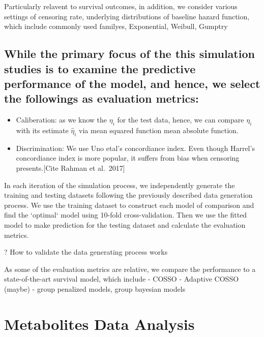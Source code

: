 \documentclass{article}
\begin{document}
Particularly relavent to survival outcomes, in addition, we consider
various settings of censoring rate, underlying distributions of baseline
hazard function, which include commonly used familyes, Exponential,
Weibull, Gumptry

\hypertarget{while-the-primary-focus-of-the-this-simulation-studies-is-to-examine-the-predictive-performance-of-the-model-and-hence-we-select-the-followings-as-evaluation-metrics}{%
\subsection{While the primary focus of the this simulation studies is to
examine the predictive performance of the model, and hence, we select
the followings as evaluation
metrics:}\label{while-the-primary-focus-of-the-this-simulation-studies-is-to-examine-the-predictive-performance-of-the-model-and-hence-we-select-the-followings-as-evaluation-metrics}}

\begin{itemize}
\tightlist
\item
  Caliberation: as we know the \(\eta_i\) for the test data, hence, we
  can compare \(\eta_i\) with its estimate \(\hat \eta_i\) via mean
  squared function mean absolute function.
\item
  Discrimination: We use Uno etal's concordiance index. Even though
  Harrel's concordiance index is more popular, it suffers from bias when
  censoring presents.{[}Cite Rahman et al.~2017{]}
\end{itemize}

In each iteration of the simulation process, we independently generate
the training and testing datasets following the previously described
data generation process. We use the training dataset to construct each
model of comparison and find the `optimal` model using 10-fold
cross-validation. Then we use the fitted model to make prediction for
the testing dataset and calculate the evaluation metrics.

? How to validate the data generating process works

As some of the evaluation metrics are relative, we compare the
performance to a state-of-the-art survival model, which include - COSSO
- Adaptive COSSO (maybe) - group penalized models, group bayesian models

\newpage

\hypertarget{metabolites-data-analysis}{%
\section{Metabolites Data Analysis}\label{metabolites-data-analysis}}
\end{document}
